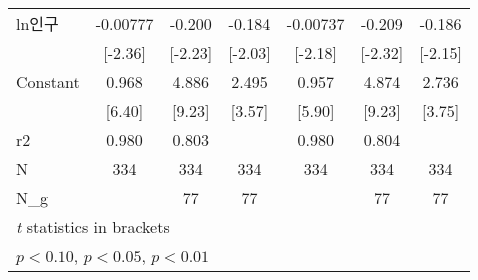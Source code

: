 \begin{table}[htbp]
\begin{tabular}{l*{6}{c}}
\addlinespace
ln인구            &    -0.00777\sym{**} &      -0.200\sym{**} &      -0.184\sym{**} &    -0.00737\sym{**} &      -0.209\sym{**} &      -0.186\sym{**} \\
                    &     [-2.36]         &     [-2.23]         &     [-2.03]         &     [-2.18]         &     [-2.32]         &     [-2.15]         \\
\addlinespace
Constant            &       0.968\sym{***}&       4.886\sym{***}&       2.495\sym{***}&       0.957\sym{***}&       4.874\sym{***}&       2.736\sym{***}\\
                    &      [6.40]         &      [9.23]         &      [3.57]         &      [5.90]         &      [9.23]         &      [3.75]         \\
\midrule
r2                  &       0.980         &       0.803         &                     &       0.980         &       0.804         &                     \\
N                   &         334         &         334         &         334         &         334         &         334         &         334         \\
N\_g                 &                     &          77         &          77         &                     &          77         &          77         \\
\bottomrule
\multicolumn{7}{l}{\footnotesize \textit{t} statistics in brackets}\\
\multicolumn{7}{l}{\footnotesize \sym{*} \(p<0.10\), \sym{**} \(p<0.05\), \sym{***} \(p<0.01\)}\\
\end{tabular}
\end{table}